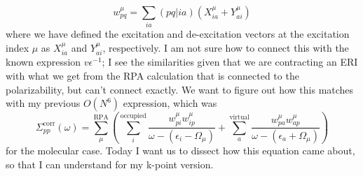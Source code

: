\begin{equation}
    w_{pq}^{\mu} = \sum_{ia} (pq|ia) \left(X_{ia}^{\mu} + Y_{ai}^{\mu}\right)
\end{equation}
where we have defined the excitation and de-excitation vectors at the excitation index $\mu$ as $X_{ia}^{\mu}$ and $Y_{ai}^{\mu}$, respectively.
I am not sure how to connect this with the known expression $v\epsilon ^{-1}$; I see the similarities given that we are contracting an ERI with what we get from the RPA calculation that is connected to the polarizability, but can't connect exactly.
We want to figure out how this matches with my previous $O(N^6)$ expression, which was
\begin{equation}
    \Sigma_{pp}^{\text{corr}}(\omega) = \sum_{\mu }^{\text{RPA}}\left(\sum_{i}^{\text{occupied}} \frac{w_{pi}^{\mu }w_{ip}^{\mu }}{\omega -(\epsilon _{i}-\Omega  _{\mu })}+ \sum_{a}^{\text{virtual}} \frac{w_{pa}^{\mu }w_{ap}^{\mu }}{\omega -(\epsilon _{a}+\Omega  _{\mu })}\right)
\end{equation}
for the molecular case. Today I want us to dissect how this equation came about, so that I can understand for my k-point version.

